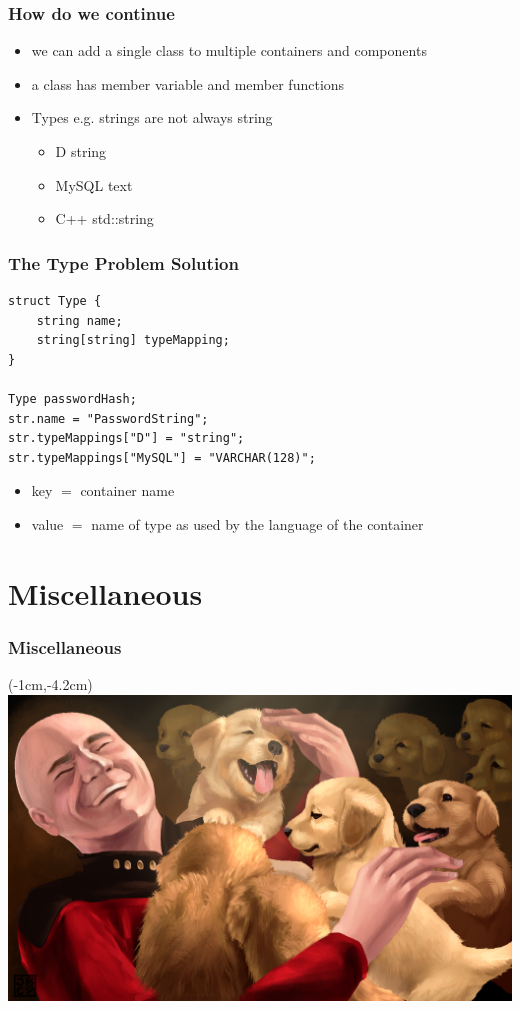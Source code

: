 \documentclass[xelatex,13pt]{beamer}
\begin{document}
\begin{frame}[fragile]
	\frametitle{How do we continue}
	\begin{itemize}
		\item we can add a single class to multiple containers and components
		\item a class has member variable and member functions
		\item Types \pause e.g. strings are not always string
		\begin{itemize}
			\item D string
			\item MySQL text
			\item C++ std::string
		\end{itemize}
	\end{itemize}
\end{frame}
\begin{frame}[fragile]
	\frametitle{The Type Problem Solution}
\begin{lstlisting}
struct Type {
    string name;
    string[string] typeMapping;
}

Type passwordHash;
str.name = "PasswordString";
str.typeMappings["D"] = "string";
str.typeMappings["MySQL"] = "VARCHAR(128)";
\end{lstlisting}
\pause
\begin{itemize}
	\item key \(=\) container name
	\item value \(=\) name of type as used by the language of the container
\end{itemize}
\end{frame}

\section{Miscellaneous}
\begin{frame}
	\frametitle{Miscellaneous}
\end{frame}

\begin{frame}[plain]
\begin{textblock*}{0cm}(-1cm,-4.2cm)
	\includegraphics[width=1.0\paperwidth]{picardpuppy.png}
\end{textblock*}
\end{frame}
\end{document}
